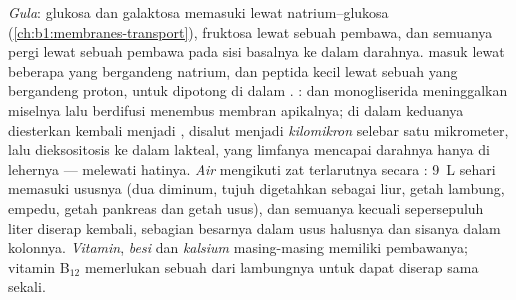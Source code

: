 \begin{proposition}\label{prop:b1:digestion-absorption:routes}
\emph{Gula}: glukosa dan galaktosa memasuki  lewat
 natrium--glukosa (\cref{ch:b1:membranes-transport}),
fruktosa lewat sebuah pembawa, dan semuanya pergi lewat sebuah pembawa
pada sisi basalnya ke dalam darahnya. \emph{} masuk lewat
beberapa  yang bergandeng natrium, dan peptida kecil lewat
sebuah  yang bergandeng proton, untuk dipotong di dalam
. \emph{}:  dan monogliserida meninggalkan
miselnya lalu berdifusi menembus membran apikalnya; di dalam 
keduanya diesterkan kembali menjadi , disalut 
menjadi \emph{kilomikron} selebar satu mikrometer, lalu dieksositosis
ke dalam lakteal, yang limfanya mencapai darahnya hanya di lehernya
---  melewati hatinya. \emph{Air} mengikuti zat terlarutnya
secara : \qty{9}{L} sehari memasuki ususnya (dua diminum, tujuh
digetahkan sebagai liur, getah lambung, empedu, getah pankreas dan
getah usus), dan semuanya kecuali sepersepuluh liter diserap kembali,
sebagian besarnya dalam usus halusnya dan sisanya dalam kolonnya.
\emph{Vitamin}, \emph{besi} dan \emph{kalsium} masing-masing memiliki
pembawanya; vitamin B$_{12}$ memerlukan sebuah  dari lambungnya
untuk dapat diserap sama sekali.
\end{proposition}

